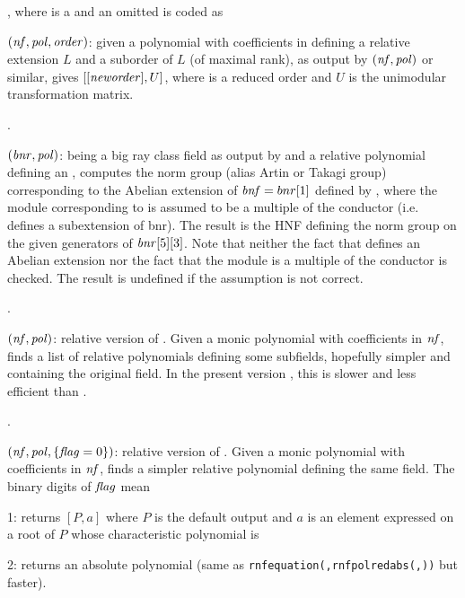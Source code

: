 , where
 is a  and an omitted  is coded as

$(\hbox{\it nf\/},\hbox{\it pol\/},\hbox{\it order\/})$: given a polynomial
 with coefficients in  defining a relative extension $L$ and
a suborder  of $L$ (of maximal rank), as output by
$(\hbox{\it nf\/},\hbox{\it pol\/})$ or similar, gives
$[[\hbox{\it neworder\/}],U]$, where  is a reduced order and $U$ is
the unimodular transformation matrix.

.

$(\hbox{\it bnr\/},\hbox{\it pol\/})$:  being a big ray
class field as output by  and  a relative polynomial
defining an , computes the norm group (alias Artin
or Takagi group) corresponding to the Abelian extension of $\hbox{\it bnf\/}=bnr[1]$
defined by , where the module corresponding to  is assumed
to be a multiple of the conductor (i.e.~ defines a subextension of
bnr). The result is the HNF defining the norm group on the given generators
of $\hbox{\it bnr\/}[5][3]$. Note that neither the fact that  defines an
Abelian extension nor the fact that the module is a multiple of the conductor
is checked. The result is undefined if the assumption is not correct.

.

$(\hbox{\it nf\/},\hbox{\it pol\/})$: relative version of .
Given a monic polynomial  with coefficients in $\hbox{\it nf\/}$, finds a
list of relative polynomials defining some subfields, hopefully simpler and
containing the original field. In the present version \vers, this is slower
and less efficient than .

.

$(\hbox{\it nf\/},\hbox{\it pol\/},\{\hbox{\it f\kern0pt lag\/}=0\})$: relative version of
. Given a monic polynomial  with coefficients in
$\hbox{\it nf\/}$, finds a simpler relative polynomial defining the same field. The
binary digits of $\hbox{\it f\kern0pt lag\/}$ mean

1: returns $[P,a]$ where $P$ is the default output and $a$ is an
element expressed on a root of $P$ whose characteristic polynomial is

2: returns an absolute polynomial (same as
{\tt rnfequation(,rnfpolredabs(,))}
but faster).

